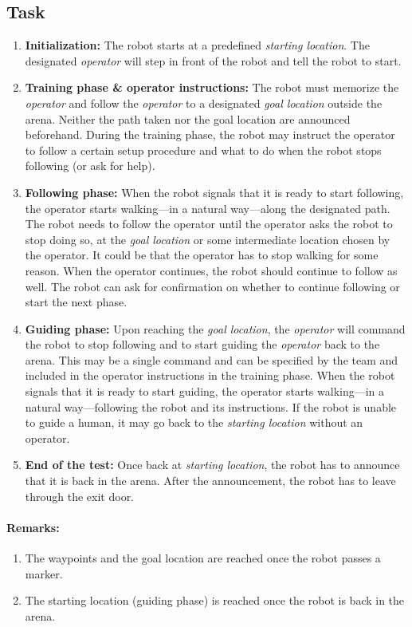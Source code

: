 \subsection{Task}

\begin{enumerate}
\item \textbf{Initialization:} The robot starts at a predefined \emph{starting location}. 
  The designated \textit{operator} will step in front of the robot and tell the robot to start. 
\item \textbf{Training phase \& operator instructions:} The robot must memorize the \textit{operator} and follow the \emph{operator} to a designated \emph{goal location} outside the arena. 
  Neither the path taken nor the goal location are announced beforehand.
  During the training phase, the robot may instruct the operator to follow a certain setup procedure and what to do when the robot stops following (or ask for help).
\item \textbf{Following phase:} When the robot signals that it is ready to start following, the operator starts walking---in a natural way---along the designated path. 
  The robot needs to follow the operator until the operator asks the robot to stop doing so, at the \textit{goal location} or some intermediate location chosen by the operator.
  It could be that the operator has to stop walking for some reason. When the operator continues, the robot should continue to follow as well. 
  The robot can ask for confirmation on whether to continue following or start the next phase. 
\item \textbf{Guiding phase:} Upon reaching the \textit{goal location}, the \textit{operator} will command the robot to stop following and to start guiding the \emph{operator} back to the arena.
  This may be a single command and can be specified by the team and included in the operator instructions in the training phase.
  When the robot signals that it is ready to start guiding, the operator starts walking---in a natural way---following the robot and its instructions.
  If the robot is unable to guide a human, it may go back to the \textit{starting location} without an operator. 
\item \textbf{End of the test:} Once back at \textit{starting location}, the robot has to announce that it is back in the arena. 
  After the announcement, the robot has to leave through the exit door.
\end{enumerate}

\paragraph*{Remarks:}
\begin{enumerate}
\item The waypoints and the goal location are reached once the robot passes a marker.
\item The starting location (guiding phase) is reached once the robot is back in the arena.
\end{enumerate}

